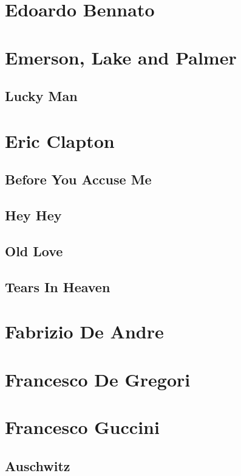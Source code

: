 \chapter{Edoardo Bennato}

\chapter{Emerson, Lake and Palmer}
\section{Lucky Man}

\chapter{Eric Clapton}
\section{Before You Accuse Me}
\section{Hey Hey}
\section{Old Love}
\section{Tears In Heaven}

\chapter{Fabrizio De Andre}

\chapter{Francesco De Gregori}

\chapter{Francesco Guccini}
\section{Auschwitz}
